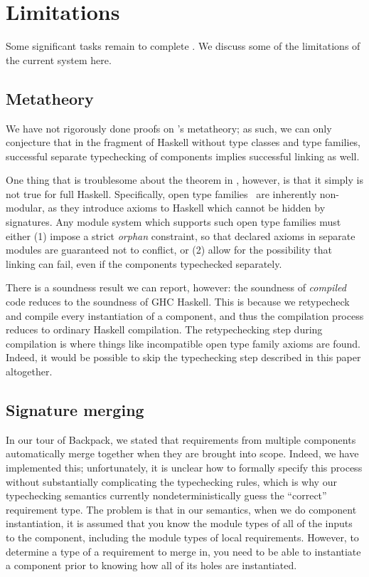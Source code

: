 \chapter{Limitations}
\label{sec:limitations}

Some significant tasks remain to complete \Backpack{}.  We discuss
some of the limitations of the current system here.

\section{Metatheory}
\label{sec:metatheory}

We have not rigorously done proofs on \Backpack{}'s metatheory; as such, we can
only conjecture that in the fragment of Haskell without type classes
and type families, successful separate typechecking of components
implies successful linking as well.

One thing that is troublesome about the theorem in \OldBackpack{}, however,
is that it simply is not true for full Haskell.  Specifically,
open type families~\cite{schrijvers+:typefamilies} are inherently non-modular, as they
introduce axioms to Haskell which cannot be hidden by signatures.
Any module system which supports such open type families must either
(1) impose a strict \emph{orphan} constraint, so that declared axioms
in separate modules are guaranteed not to conflict, or (2) allow
for the possibility that linking can fail, even if the components
typechecked separately.

There is a soundness result we can report, however: the soundness of
\emph{compiled} \Backpack{} code reduces to the soundness of GHC
Haskell.  This is because we retypecheck and compile every instantiation
of a component, and thus the compilation process reduces to ordinary
Haskell compilation.  The retypechecking step during compilation is
where things like incompatible open type family axioms are found.
Indeed, it would be possible to skip the typechecking step described in
this paper altogether.

\section{Signature merging}
\label{sec:merging}

In our tour of Backpack, we stated that requirements from multiple
components automatically merge together when they are brought into
scope.  Indeed, we have implemented this; unfortunately, it is unclear
how to formally specify this process without substantially complicating
the typechecking rules, which is why our typechecking semantics
currently nondeterministically guess the ``correct'' requirement type.
The problem is that in our semantics, when we do component
instantiation, it is assumed that you know the module types of all of
the inputs to the component, including the module types of local
requirements.  However, to determine a type of a requirement to merge
in, you need to be able to instantiate a component prior to knowing how
all of its holes are instantiated.

